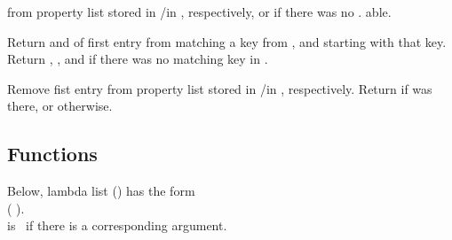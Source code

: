 \begin{LIST}{1cm}
  \label{:property_lists}
  {
   from property list stored in
  /in , respectively, or  if
  there was no . able.
  }

  {
  Return  and  of first entry from 
  matching a key from , and  starting with that key. Return \retval{\NIL},
  \retvalii{\NIL}, and  \retvaliii{\NIL} if there was no matching key
  in .
  }

  {
  Remove fist entry  from property list stored in
  /in , respectively. Return \retval{\T} if 
  was there, or \retval{\NIL} otherwise.
  }

\end{LIST}


\subsection{Functions}
\label{section:Functions}


Below, lambda list () has the form\\
(
).\\
 is \T\ if there is a corresponding argument.

